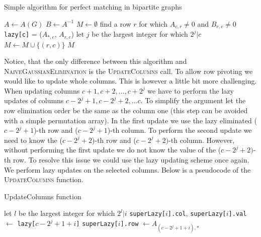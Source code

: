 \begin{algorithm}
\caption{Simple algorithm for perfect matching in bipartite graphs}
\begin{algorithmic}[1]
\State $A \gets A(G)$
\State $B \gets A^{-1}$
\State $M \gets \emptyset$
    \State find a row $r$ for which $A_{c,r}\not=0$ and $B_{r,c}\not=0$
    \State \texttt{lazy[c]} = ($A_{*,c}$, $A_{r,c}$)
    \State let $j$ be the largest integer for which $2^j|c$
    \State {}
    \State $M \gets M\cup\{(r,c)\}$
\EndFor
\State \Return $M$
\EndFunction
\end{algorithmic}
\end{algorithm}

Notice, that the only difference between this algorithm and \textsc{NaiveGaussianElimination} is the \textsc{UpdateColumns} call.
To allow row pivoting we would like to update whole columns.
This is however a little bit more challenging. When updating columns $c+1,c+2,...,c+2^j$ we have to perform the lazy updates of columns $c-2^j+1,c-2^j+2,...c$.
To simplify the argument let the row elimination order be the same as the column one (this step can be avoided with a simple permutation array).
In the first update we use the lazy eliminated ($c-2^j+1$)-th row and ($c-2^j+1$)-th column.
To perform the second update we need to know the ($c-2^j+2$)-th row and ($c-2^j+2)$-th column.
However, without performing the first update we do not know the value of the ($c-2^j+2)$-th row.
To resolve this issue we could use the lazy updating scheme once again. We perform lazy updates on the selected columns.
Below is a pseudocode of the \textsc{UpdateColumns} function.

\begin{algorithm}
\caption{UpdateColumns function}
\begin{algorithmic}[1]
\State let $l$ be the largest integer for which $2^l|i$
\State {}
\State \texttt{superLazy[$i$].col}, \texttt{superLazy[$i$].val} $\gets$ \texttt{lazy[$c-2^j+1+i$]}
\State \texttt{superLazy[$i$].row} $\gets A_{(c-2^j+1+i), *}$
\EndFor
\EndFunction
\end{algorithmic}
\end{algorithm}

